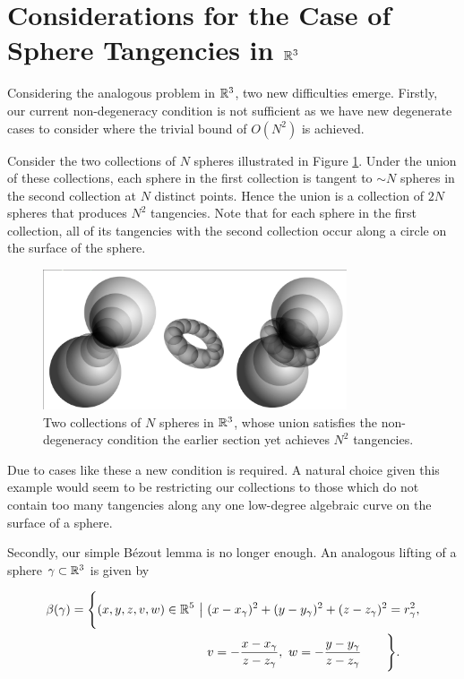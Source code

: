 \section[The Case of Sphere Tangencies in $\RR^{3}$]{Considerations for the Case of Sphere Tangencies in $\RR^{3}$}
Considering the analogous problem in $\RR^{3}$, two new difficulties emerge. 
Firstly, our current non-degeneracy condition is not sufficient as we have new degenerate cases to consider where the trivial bound of $O(N^2)$ is achieved. 
\begin{example}
    Consider the two collections of $N$ spheres illustrated in Figure \ref{fig:degen-3d}. Under the union of these collections, each sphere in the first collection is tangent to $\sim N$ spheres in the second collection at $N$ distinct points. 
    Hence the union is a collection of $2N$ spheres that produces $N^2$ tangencies. Note that for each sphere in the first collection, all of its tangencies with the second collection occur along a circle on the surface of the sphere.
    \begin{figure}[h]
        \centering 
        \includegraphics[width=0.8\textwidth]{images/degenr3.png}
        \caption{Two collections of $N$ spheres in $\mathbb R^3$, whose union satisfies the non-degeneracy condition the earlier section yet achieves $N^2$ tangencies. \label{fig:degen-3d}}
        \end{figure}
\end{example}
Due to cases like these a new condition is required. 
A natural choice given this example would seem to be restricting our collections to those which do not contain too many tangencies 
along any one low-degree algebraic curve on the surface of a sphere. 

Secondly, our simple Bézout lemma is no longer enough. An analogous lifting of a sphere $\gamma \subset \mathbb R^3$ is given by

\begin{align*}
    \beta(\gamma) = \Biggl \{ (x,y,z,v,w) \in \RR^5 \  \big | \ &(x-x_\gamma)^2 + (y-y_\gamma)^2 + (z-z_\gamma)^2 = r_\gamma^2, \\
     &v = - \frac{x-x_\gamma}{z-z_\gamma}, \ w = - \frac{y-y_\gamma}{z-z_\gamma} \qquad  \Biggr \} .
\end{align*}


